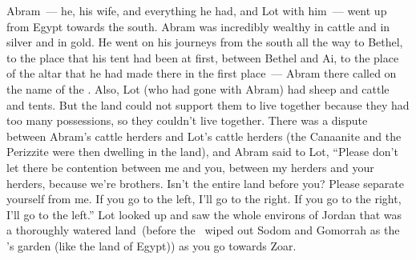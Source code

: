 
\begin{inparaenum}
   Abram~--- he, his wife, and everything he had, and Lot with him~--- went up from Egypt towards the south.%
   Abram was incredibly wealthy in cattle and in silver and in gold.%
   He went on his journeys from the south all the way to Bethel, to the place that his tent had been at first, between Bethel and Ai,%
   to the place of the altar that he had made there in the first place~--- Abram there called on the name of the \lord.%
   Also, Lot (who had gone with Abram) had sheep and cattle and tents.%
   But the land could not support them to live together because they had too many possessions, so they couldn't live together.%
   There was a dispute between Abram's cattle herders and Lot's cattle herders (the Canaanite and the Perizzite were then dwelling in the land),%
   and Abram said to Lot, ``Please don't let there be contention between me and you, between my herders and your herders, because we're brothers.%
   Isn't the entire land before you? Please separate yourself from me. If you go to the left, I'll go to the right. If you go to the right, I'll go to the left.''%
   Lot looked up and saw the whole environs of Jordan that was a thoroughly watered land\understood\ (before the \lord\ wiped out Sodom and Gomorrah as the \lord's garden (like the land of Egypt)) as you go towards Zoar.%

\end{inparaenum}
